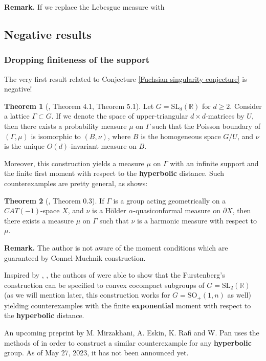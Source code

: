 \documentclass[11pt]{amsart}
\theoremstyle{definition}
\newtheorem{theorem}{Theorem}[section]
\begin{document}
	\textbf{Remark.} If we replace the Lebesgue measure with
	
	\subsection{Negative results}
	\subsubsection{Dropping finiteness of the support}
	The very first result related to Conjecture \ref{Fuchsian singularity conjecture} is negative!
	
	\begin{theorem}[\cite{furstenberg71}, Theorem 4.1, Theorem 5.1]
		Let $G = \mathrm{SL}_d(\mathbb{R})$ for $d \ge 2$. Consider a lattice $\Gamma \subset G$. If we denote the space of upper-triangular $d \times d$-matrices by $U$, then there exists a probability measure $\mu$ on $\Gamma$ such that the Poisson boundary of $(\Gamma, \mu)$ is isomorphic to $(B, \nu)$, where $B$ is the homogeneous space $G / U$, and $\nu$ is the unique $O(d)$-invariant measure on $B$. 
	\end{theorem} 
	
	Moreover, this construction yields a measure $\mu$ on $\Gamma$ with an infinite support and the finite first moment with respect to the \textbf{hyperbolic} distance. Such counterexamples are pretty general, as \cite{connelmuchnik} shows:
	
	\begin{theorem}[\cite{connelmuchnik}, Theorem 0.3]
		If $\Gamma$ is a group acting geometrically on a $CAT(-1)$-space $X$, and $\nu$ is a H\"{o}lder $\alpha$-quasiconformal measure on $\partial X$, then there exists a measure $\mu$ on $\Gamma$ such that $\nu$ is a harmonic measure with respect to $\mu$.
	\end{theorem}
	\textbf{Remark.} The author is not aware of the moment conditions which are guaranteed by Connel-Muchnik construction.
	
	Inspired by \cite{furstenberg71}, \cite{connelmuchnik}, the authors of \cite{linaudpan} were able to show that the Furstenberg's construction can be specified to convex cocompact subgroups of $G = \text{SL}_2(\mathbb{R})$ (as we will mention later, this construction works for $G = \text{SO}_+(1, n)$ as well) yielding counterexamples with the finite \textbf{exponential} moment with respect to the \textbf{hyperbolic} distance.
	
	An upcoming preprint by M. Mirzakhani, A. Eskin, K. Rafi and W. Pan uses the methods of \cite{connelmuchnik} in order to construct a similar counterexample for any \textbf{hyperbolic} group. As of May 27, 2023, it has not been announced yet.
	
\end{document}
